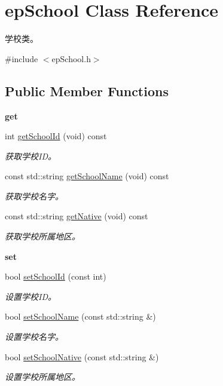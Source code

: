 \hypertarget{classepSchool}{\section{ep\-School \-Class \-Reference}
\label{classepSchool}
}


学校类。  




{\ttfamily \#include $<$ep\-School.\-h$>$}

\subsection*{\-Public \-Member \-Functions}
\begin{Indent}{\bf get}\par
\begin{DoxyCompactItemize}
\item 
int \hyperlink{classepSchool_a7eb9011e949c327396fb6a58e2d8c85d}{get\-School\-Id} (void) const 
\begin{DoxyCompactList}\small\item\em 获取学校\-I\-D。 \end{DoxyCompactList}\item 
const std\-::string \hyperlink{classepSchool_aeddc5891f2374da5d3b701649f767634}{get\-School\-Name} (void) const 
\begin{DoxyCompactList}\small\item\em 获取学校名字。 \end{DoxyCompactList}\item 
const std\-::string \hyperlink{classepSchool_a3b2da2e2c8efd1ddf2c6c35f669b681c}{get\-Native} (void) const 
\begin{DoxyCompactList}\small\item\em 获取学校所属地区。 \end{DoxyCompactList}\end{DoxyCompactItemize}
\end{Indent}
\begin{Indent}{\bf set}\par
\begin{DoxyCompactItemize}
\item 
bool \hyperlink{classepSchool_aad4664726a7b42b39a31a8ff525e5804}{set\-School\-Id} (const int)
\begin{DoxyCompactList}\small\item\em 设置学校\-I\-D。 \end{DoxyCompactList}\item 
bool \hyperlink{classepSchool_ad9af1409fe4c439f2d76eadad8f62621}{set\-School\-Name} (const std\-::string \&)
\begin{DoxyCompactList}\small\item\em 设置学校名字。 \end{DoxyCompactList}\item 
bool \hyperlink{classepSchool_af591e95bd6531d301ce1de78497c7a9c}{set\-School\-Native} (const std\-::string \&)
\begin{DoxyCompactList}\small\item\em 设置学校所属地区。 \end{DoxyCompactList}\end{DoxyCompactItemize}
\end{Indent}
